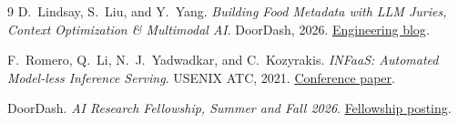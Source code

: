 \documentclass{article}
\begin{document}
\begin{thebibliography}{9}
\small
{}
D.~Lindsay, S.~Liu, and Y.~Yang.
\emph{Building Food Metadata with LLM Juries, Context Optimization \& Multimodal AI}.
DoorDash, 2026.
\href{https://careersatdoordash.com/blog/building-food-metadata-with-llm-juries-context-optimization-multimodal-ai/}{Engineering blog}.

F.~Romero, Q.~Li, N.~J.~Yadwadkar, and C.~Kozyrakis.
\emph{INFaaS: Automated Model-less Inference Serving}.
USENIX ATC, 2021.
\href{https://www.usenix.org/conference/atc21/presentation/romero}{Conference paper}.

DoorDash. \emph{AI Research Fellowship, Summer and Fall 2026}.
\href{https://job-boards.greenhouse.io/doordashusa/jobs/7848317}{Fellowship posting}.
\end{thebibliography}
\end{document}
